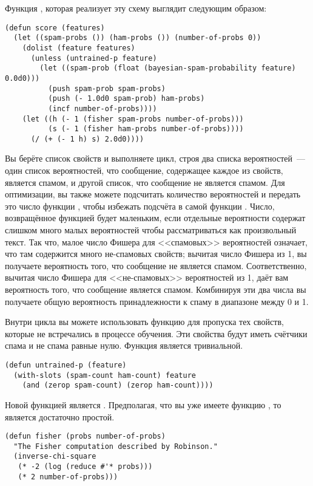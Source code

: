 Функция , которая реализует эту схему выглядит следующим образом:

\begin{lstlisting}
(defun score (features)
  (let ((spam-probs ()) (ham-probs ()) (number-of-probs 0))
    (dolist (feature features)
      (unless (untrained-p feature)
        (let ((spam-prob (float (bayesian-spam-probability feature) 0.0d0)))
          (push spam-prob spam-probs)
          (push (- 1.0d0 spam-prob) ham-probs)
          (incf number-of-probs))))
    (let ((h (- 1 (fisher spam-probs number-of-probs)))
          (s (- 1 (fisher ham-probs number-of-probs))))
      (/ (+ (- 1 h) s) 2.0d0))))
\end{lstlisting}

Вы берёте список свойств и выполняете цикл, строя два списка вероятностей~--- один список
вероятностей, что сообщение, содержащее каждое из свойств, является спамом, и другой
список, что сообщение не является спамом.  Для оптимизации, вы также можете подсчитать
количество вероятностей и передать это число функции , чтобы избежать
подсчёта в самой функции .  Число, возвращённое функцией  будет
маленьким, если отдельные вероятности содержат слишком много малых вероятностей чтобы
рассматриваться как произвольный текст.  Так что, малое число Фишера для <<спамовых>>
вероятностей означает, что там содержится много не-спамовых свойств; вычитая число Фишера
из 1, вы получаете вероятность того, что сообщение не является спамом.  Соответственно,
вычитая число Фишера для <<не-спамовых>> вероятностей из 1, даёт вам вероятность того, что
сообщение является спамом.  Комбинируя эти два числа вы получаете общую вероятность
принадлежности к спаму в диапазоне между 0 и 1.

Внутри цикла вы можете использовать функцию  для пропуска тех свойств,
которые не встречались в процессе обучения.  Эти свойства будут иметь счётчики спама и не
спама равные нулю.  Функция  является тривиальной.

\begin{lstlisting}
(defun untrained-p (feature)
  (with-slots (spam-count ham-count) feature
    (and (zerop spam-count) (zerop ham-count))))
\end{lstlisting}

Новой функцией является .  Предполагая, что вы уже имеете функцию
, то  является достаточно простой.

\begin{lstlisting}
(defun fisher (probs number-of-probs)
  "The Fisher computation described by Robinson."
  (inverse-chi-square 
   (* -2 (log (reduce #'* probs)))
   (* 2 number-of-probs)))
\end{lstlisting}

